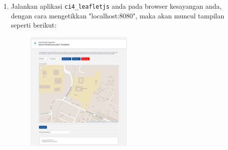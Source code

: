 \begin{enumerate}
	\vspace{4cm}
	\item Jalankan aplikasi \verb|ci4_leafletjs| anda pada browser kesayangan anda, dengan cara mengetikkan "localhost:8080", maka akan muncul tampilan seperti berikut:
	\begin{figure}[!htbp]
		\centering
		\includegraphics[width=0.5\textwidth]{figures/LEAFLETJS/LJS4.png}
		\label{Leaflet4}
	\end{figure}
	
\end{enumerate}